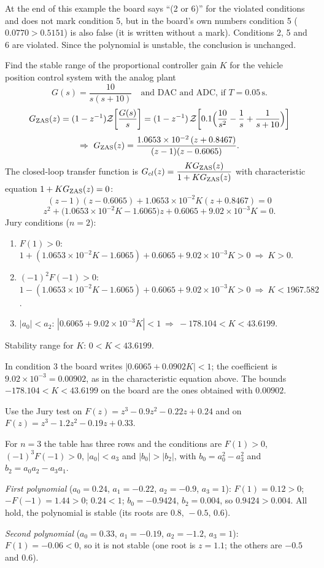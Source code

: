 \begin{boardnote}
At the end of this example the board says ``(2 or 6)'' for the violated conditions and does not mark condition
5, but in the board's own numbers condition 5 ($0.0770>0.5151$) is also false (it is written without a
mark). Conditions 2, 5 and 6 are violated. Since the polynomial is unstable, the conclusion is unchanged.
\end{boardnote}

\begin{example}
Find the stable range of the proportional controller gain $K$ for the vehicle position control system with
the analog plant
\[
  G(s)=\frac{10}{s(s+10)}\quad\text{and DAC and ADC, if } T=0.05\,\mathrm{s}.
\]
\[
  G_{\mathrm{ZAS}}(z)=(1-z^{-1})\mathcal{Z}\!\left[\frac{G(s)}{s}\right]=(1-z^{-1})\,\mathcal{Z}\!\left[0.1\Bigl(\frac{10}{s^{2}}-\frac1s+\frac{1}{s+10}\Bigr)\right]
\]
\[
  \Rightarrow\ \GZAS(z)=\frac{1.0653\times10^{-2}\,(z+0.8467)}{(z-1)(z-0.6065)}.
\]
The closed-loop transfer function is $G_{cl}(z)=\dfrac{KG_{\mathrm{ZAS}}(z)}{1+KG_{\mathrm{ZAS}}(z)}$ with characteristic equation
$1+KG_{\mathrm{ZAS}}(z)=0$:
\[
  (z-1)(z-0.6065)+1.0653\times10^{-2}K(z+0.8467)=0
\]
\[
  z^{2}+\bigl(1.0653\times10^{-2}K-1.6065\bigr)z+0.6065+9.02\times10^{-3}K=0.
\]
Jury conditions ($n=2$):
\begin{enumerate}
  \item $F(1)>0$: $1+(1.0653\times10^{-2}K-1.6065)+0.6065+9.02\times10^{-3}K>0\ \Rightarrow\ K>0$.
  \item $(-1)^{2}F(-1)>0$: $1-(1.0653\times10^{-2}K-1.6065)+0.6065+9.02\times10^{-3}K>0\ \Rightarrow\ K<1967.582$.
  \item $|a_0|<a_2$: $|0.6065+9.02\times10^{-3}K|<1\ \Rightarrow\ -178.104<K<43.6199$.
\end{enumerate}
Stability range for $K$: $0<K<43.6199$.
\end{example}

\begin{boardnote}
In condition 3 the board writes $|0.6065+0.0902K|<1$; the coefficient is $9.02\times10^{-3}=0.00902$, as in the
characteristic equation above. The bounds $-178.104<K<43.6199$ on the board are the ones obtained with $0.00902$.
\end{boardnote}

\begin{problem}
Use the Jury test on $F(z)=z^{3}-0.9z^{2}-0.22z+0.24$ and on $F(z)=z^{3}-1.2z^{2}-0.19z+0.33$.
\end{problem}
\begin{solution}
For $n=3$ the table has three rows and the conditions are $F(1)>0$, $(-1)^{3}F(-1)>0$, $|a_0|<a_3$ and
$|b_0|>|b_2|$, with $b_0=a_0^{2}-a_3^{2}$ and $b_2=a_0a_2-a_3a_1$.\par
\emph{First polynomial} ($a_0=0.24$, $a_1=-0.22$, $a_2=-0.9$, $a_3=1$): $F(1)=0.12>0$;
$-F(-1)=1.44>0$; $0.24<1$; $b_0=-0.9424$, $b_2=0.004$, so $0.9424>0.004$. All hold, the polynomial is stable
(its roots are $0.8,\,-0.5,\,0.6$).\par
\emph{Second polynomial} ($a_0=0.33$, $a_1=-0.19$, $a_2=-1.2$, $a_3=1$): $F(1)=-0.06<0$, so it is not stable
(one root is $z=1.1$; the others are $-0.5$ and $0.6$).
\end{solution}
